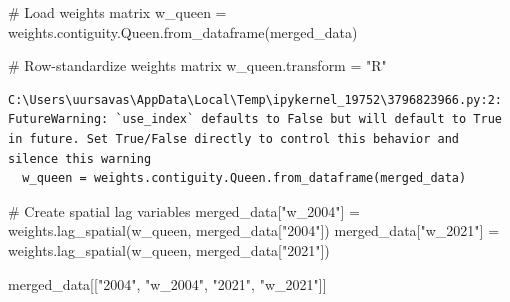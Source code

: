 \documentclass[
  letterpaper,
  DIV=11,
  numbers=noendperiod]{scrreprt}
\newenvironment{Shaded}{\begin{snugshade}}{\end{snugshade}}
\newcommand{\CommentTok}[1]{\textcolor[rgb]{0.37,0.37,0.37}{#1}}
\newcommand{\NormalTok}[1]{\textcolor[rgb]{0.00,0.23,0.31}{#1}}
\newcommand{\OperatorTok}[1]{\textcolor[rgb]{0.37,0.37,0.37}{#1}}
\newcommand{\StringTok}[1]{\textcolor[rgb]{0.13,0.47,0.30}{#1}}
\begin{document}
\begin{Shaded}
\begin{Highlighting}[]

\end{Highlighting}
\end{Shaded}

\begin{Shaded}
\begin{Highlighting}[]
\CommentTok{\# Load weights matrix}
\NormalTok{w\_queen }\OperatorTok{=}\NormalTok{ weights.contiguity.Queen.from\_dataframe(merged\_data)}


\CommentTok{\# Row{-}standardize weights matrix}
\NormalTok{w\_queen.transform }\OperatorTok{=} \StringTok{"R"}
\end{Highlighting}
\end{Shaded}

\begin{verbatim}
C:\Users\uursavas\AppData\Local\Temp\ipykernel_19752\3796823966.py:2: FutureWarning: `use_index` defaults to False but will default to True in future. Set True/False directly to control this behavior and silence this warning
  w_queen = weights.contiguity.Queen.from_dataframe(merged_data)
\end{verbatim}

\begin{Shaded}
\begin{Highlighting}[]
\CommentTok{\# Create spatial lag variables}
\NormalTok{merged\_data[}\StringTok{"w\_2004"}\NormalTok{] }\OperatorTok{=}\NormalTok{ weights.lag\_spatial(w\_queen, merged\_data[}\StringTok{"2004"}\NormalTok{])}
\NormalTok{merged\_data[}\StringTok{"w\_2021"}\NormalTok{] }\OperatorTok{=}\NormalTok{ weights.lag\_spatial(w\_queen, merged\_data[}\StringTok{"2021"}\NormalTok{])}
\end{Highlighting}
\end{Shaded}

\begin{Shaded}
\begin{Highlighting}[]
\NormalTok{merged\_data[[}\StringTok{"2004"}\NormalTok{, }\StringTok{"w\_2004"}\NormalTok{, }\StringTok{"2021"}\NormalTok{, }\StringTok{"w\_2021"}\NormalTok{]]}
\end{Highlighting}
\end{Shaded}
\end{document}

